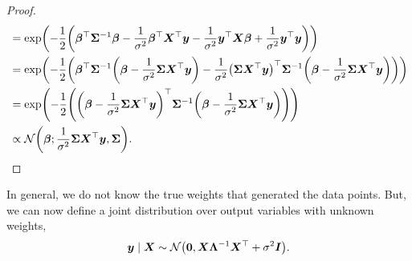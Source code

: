 \begin{proof}
\begin{align*}
                                             & = \exp \lft( -\frac{1}{2} \lft( \transpose{\vec{\beta}} \inv{\mat{\Sigma}} \vec{\beta} - \frac{1}{\sigma^2} \transpose{\vec{\beta}} \transpose{\mat{X}} \vec{y} - \frac{1}{\sigma^2} \transpose{\vec{y}} \mat{X} \vec{\beta} + \frac{1}{\sigma^2} \transpose{\vec{y}} \vec{y} \rgt) \rgt)                                                                                   \\
                                             & = \exp \lft( -\frac{1}{2} \lft( \transpose{\vec{\beta}} \inv{\mat{\Sigma}} \lft( \vec{\beta} - \frac{1}{\sigma^2} \mat{\Sigma} \transpose{\mat{X}} \vec{y} \rgt) - \frac{1}{\sigma^2} \transpose{\lft( \mat{\Sigma} \transpose{\mat{X}} \vec{y} \rgt)} \inv{\mat{\Sigma}} \lft( \vec{\beta} - \frac{1}{\sigma^2} \mat{\Sigma} \transpose{\mat{X}} \vec{y} \rgt) \rgt) \rgt) \\
                                             & = \exp \lft( -\frac{1}{2} \lft( \transpose{\lft( \vec{\beta} - \frac{1}{\sigma^2} \mat{\Sigma} \transpose{\mat{X}} \vec{y} \rgt)} \inv{\mat{\Sigma}} \lft( \vec{\beta} - \frac{1}{\sigma^2} \mat{\Sigma} \transpose{\mat{X}} \vec{y} \rgt) \rgt) \rgt)                                                                                                                      \\
                                             & \propto \mathcal{N} \lft( \vec{\beta}; \frac{1}{\sigma^2} \mat{\Sigma} \transpose{\mat{X}} \vec{y}, \mat{\Sigma} \rgt).
    \end{align*}
\end{proof}

In general, we do not know the true weights that generated the data points. But, we can now define
a joint distribution over output variables with unknown weights, \[
    \vec{y} \mid \mat{X} \sim \mathcal{N}\lft( \vec{0}, \mat{X} \inv{\mat{\Lambda}} \transpose{\mat{X}} + \sigma^2 \mat{I} \rgt).
\]

